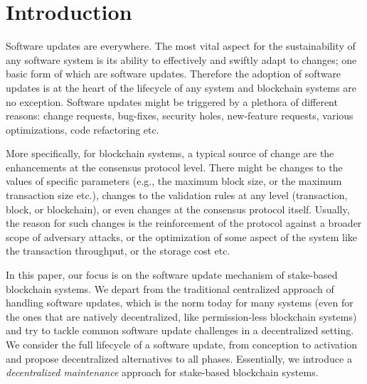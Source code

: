\section{Introduction}
Software updates are everywhere. The most vital aspect for the sustainability of
any software system is its ability to effectively and swiftly adapt to changes;
one basic form of which are software updates. Therefore the adoption of software
updates is at the heart of the lifecycle of any system and blockchain systems
are no exception. Software updates might be triggered by a plethora of different
reasons: change requests, bug-fixes, security holes, new-feature requests,
various optimizations, code refactoring etc.

More specifically, for blockchain systems, a typical source of change are the
enhancements at the consensus protocol level. There might be changes to the
values of specific parameters (e.g., the maximum block size, or the maximum
transaction size etc.), changes to the validation rules at any level
(transaction, block, or blockchain), or even changes at the consensus protocol
itself. Usually, the reason for such changes is the reinforcement of the
protocol against a broader scope of adversary attacks, or the optimization of
some aspect of the system like the transaction throughput, or the storage cost
etc.

In this paper, our focus is on the software update mechanism of stake-based
blockchain systems. We depart from the traditional centralized approach of
handling software updates, which is the norm today for many systems (even for
the ones that are natively decentralized, like permission-less blockchain
systems) and try to tackle common software update challenges in a decentralized
setting. We consider the full lifecycle of a software update, from conception to
activation and propose decentralized alternatives to all phases. Essentially, we
introduce a \emph{decentralized maintenance} approach for stake-based blockchain
systems.

